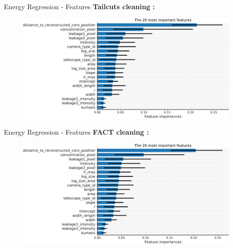 \begin{frame}{Energy Regression - Features}
        \textbf{Tailcuts cleaning :}
	\begin{figure}
            \centering
            \includegraphics[width=0.8\linewidth]{images/result_plots/tail1/reg_diff_4-crop.pdf}
	\end{figure}
\end{frame}

\begin{frame}{Energy Regression - Features}
        \textbf{FACT cleaning :}
	\begin{figure}
            \centering
            \includegraphics[width=0.8\linewidth]{images/result_plots/fact2/reg_diff_4-crop.pdf}
	\end{figure}
\end{frame}

